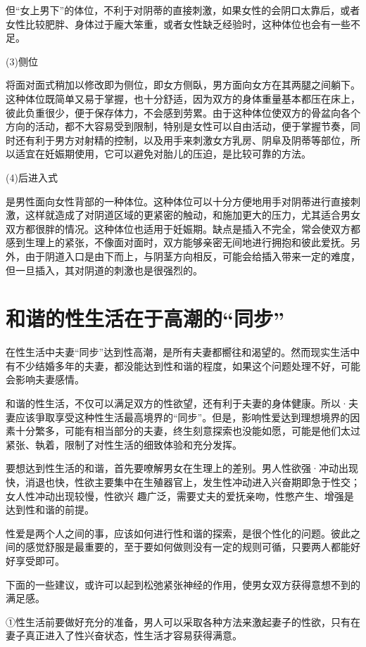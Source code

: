 \documentclass[12pt,UTF8]{ctexbook}
\begin{document}
但“女上男下”的体位，不利于对阴蒂的直接刺激，如果女性的会阴口太靠后，或者女性比较肥胖、身体过于龐大笨重，或者女性缺乏经验时，这种体位也会有一些不足。

(3)侧位

将面对面式稍加以修改即为侧位，即女方侧臥，男方面向女方在其两腿之间躺下。这种体位既简单又易于掌握，也十分舒适，因为双方的身体重量基本都压在床上，彼此负重很少，便于保存体力，不会感到劳累。由于这种体位使双方的骨盆向各个方向的活动，都不大容易受到限制，特别是女性可以自由活动，便于掌握节奏，同时还有利于男方对射精的控制，以及用手来刺激女方乳房、阴阜及阴蒂等部位，所以适宜在妊娠期使用，它可以避免对胎儿的压迫，是比较可靠的方法。

(4)后进入式

是男性面向女性背部的一种体位。这种体位可以十分方便地用手对阴蒂进行直接刺激，这样就造成了对阴道区域的更紧密的触动，和施加更大的压力，尤其适合男女双方都很胖的情况。这种体位也适用于妊娠期。缺点是插入不完全，常会使双方都感到生理上的紧张，不像面对面时，双方能够亲密无间地进行拥抱和彼此爱抚。另外，由于阴道入口是由下而上，与阴茎方向相反，可能会给插入带来一定的难度，但一旦插入，其对阴道的刺激也是很强烈的。

\section{和谐的性生活在于高潮的“同步”}

在性生活中夫妻“同步”达到性高潮，是所有夫妻都嚮往和渴望的。然而现实生活中有不少结婚多年的夫妻，都没能达到性和谐的程度，如果这个问题处理不好，可能会影响夫妻感情。

和谐的性生活，不仅可以满足双方的性欲望，还有利于夫妻的身体健康。所以·夫妻应该爭取享受这种性生活最高境界的“同步”。但是，影响性爱达到理想境界的因素十分繁多，可能有相当部分的夫妻，终生刻意探索也没能如愿，可能是他们太过紧张、執着，限制了对性生活的细致体验和充分发挥。

要想达到性生活的和谐，首先要嘹解男女在生理上的差别。男人性欲强·冲动出现快，消退也快，性欲主要集中在生殖器官上，发生性冲动进入兴奋期即急于性交；女人性冲动出现较慢，性欲兴
趣广泛，需要丈夫的爱抚亲吻，性憋产生、增强是达到性和谐的前提。

性爱是两个人之间的事，应该如何进行性和谐的探索，是很个性化的问题。彼此之间的感觉舒服是最重要的，至于要如何做则没有一定的规则可循，只要两人都能好好享受即可。

下面的一些建议，或许可以起到松弛紧张神经的作用，使男女双方获得意想不到的满足感。

①性生活前要做好充分的准备，男人可以采取各种方法来激起妻子的性欲，只有在妻子真正进入了性兴奋状态，性生活才容易获得满意。
\end{document}
